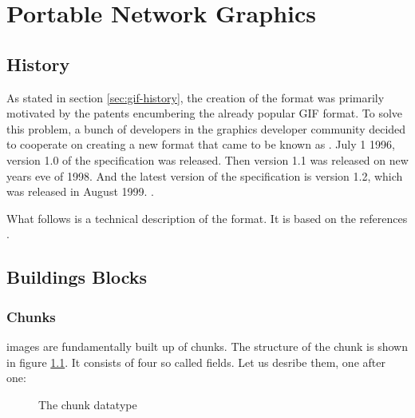 \begin{comment}
  
\end{comment}

\chapter{Portable Network Graphics}
\label{cha:png}

\newcommand{\chnk}[1]{``#1''}

\newcommand{\IDAT}{\chnk{IDAT}\xspace}

\section{History}

As stated in section \ref{sec:gif-history}, the creation of the \png
format was primarily motivated by the patents encumbering the already
popular GIF format. To solve this problem, a bunch of developers in
the graphics developer community decided to cooperate on creating a
new format that came to be known as \png. July 1 1996, version 1.0 of
the \png specification was released. Then version 1.1 was released on
new years eve of 1998. And the latest version of the \png specification
is version 1.2, which was released in August 1999.
\cite{roelofs09:_histor_portab_networ_graph_png_format,roelofs99:_png,roelofs:_portab_networ_graph_main}.

What follows is a technical description of the \png format. It is based
on the references
\cite{boutel:_png_portab_networ_graph_specif_version12,roelofs99:_png,boutel:_png_portab_networ_graph_specif_version11}.

\section{Buildings Blocks}

\subsection{Chunks}

\png images are fundamentally built up of chunks. The structure of the
chunk is shown in figure \ref{fig:png-chunk}. It consists of four so
called fields. Let us desribe them, one after one:

\begin{figure}
  \centering
  \caption{The \png chunk datatype}
  \label{fig:png-chunk}
\end{figure}


